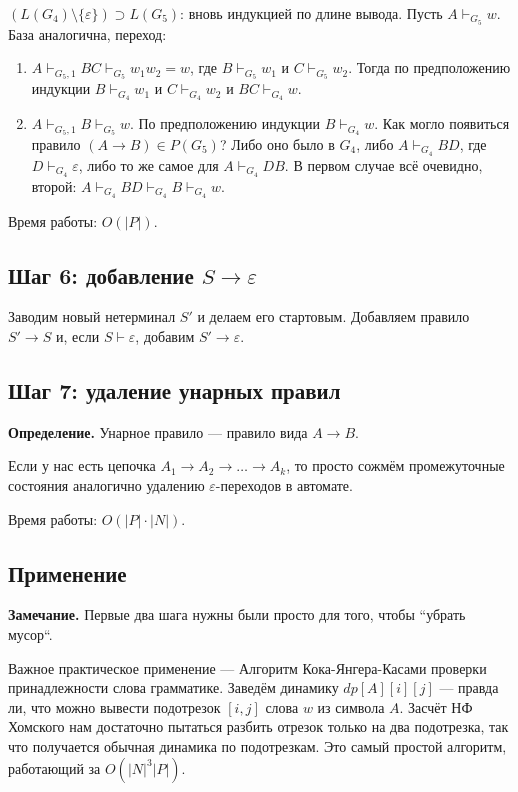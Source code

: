 $(L(G_4) \setminus \{\varepsilon\}) \supset L(G_5)$: вновь индукцией по длине вывода. Пусть $A \vdash_{G_5} w$.
База аналогична, переход:
\begin{enumerate}
    \item $A \vdash_{G_5, 1} BC \vdash_{G_5} w_1w_2 = w$, где $B \vdash_{G_5} w_1$ и $C \vdash_{G_5} w_2$.
        Тогда по предположению индукции $B \vdash_{G_4} w_1$ и $C \vdash_{G_4} w_2$ и $BC \vdash_{G_4} w$.
    \item $A \vdash_{G_5, 1} B \vdash_{G_5} w$. 
        По предположению индукции $B \vdash_{G_4} w$.
        Как могло появиться правило $(A \to B) \in P(G_5)$? 
        Либо оно было в $G_4$, либо $A \vdash_{G_4} BD$, где $D \vdash_{G_4} \varepsilon$, либо то же самое для $A \vdash_{G_4} DB$.
        В первом случае всё очевидно, второй: $A \vdash_{G_4} BD \vdash_{G_4} B \vdash_{G_4} w$.
\end{enumerate}

\QED

Время работы: $O(|P|)$.

\subsection{Шаг 6: добавление $S \to \varepsilon$}
Заводим новый нетерминал $S'$ и делаем его стартовым.
Добавляем правило $S' \to S$ и, если $S \vdash \varepsilon$, добавим $S' \to \varepsilon$.

\subsection{Шаг 7: удаление унарных правил}
\textbf{Определение.} Унарное правило --- правило вида $A \to B$.

Если у нас есть цепочка $A_1 \to A_2 \to \dots \to A_k$, то просто сожмём промежуточные состояния аналогично удалению $\varepsilon$-переходов в автомате.

Время работы: $O(|P| \cdot |N|)$.

\subsection{Применение}
\textbf{Замечание.} Первые два шага нужны были просто для того, чтобы ``убрать мусор``.

Важное практическое применение --- Алгоритм Кока-Янгера-Касами проверки принадлежности слова грамматике. 
Заведём динамику $dp[A][i][j]$ --- правда ли, что можно вывести подотрезок $[i, j]$ слова $w$ из символа $A$. 
Засчёт НФ Хомского нам достаточно пытаться разбить отрезок только на два подотрезка, так что получается обычная динамика по подотрезкам.
Это самый простой алгоритм, работающий за $O(|N|^3 |P|)$.

